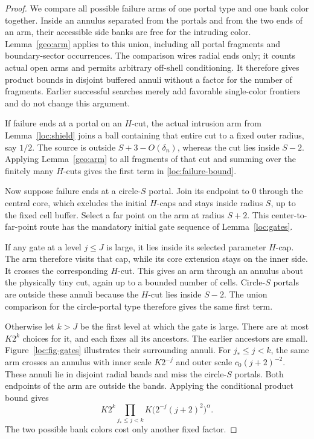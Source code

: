 \begin{proof}
We compare all possible failure arms of one portal type
and one bank color together. Inside an annulus separated
from the portals and from the two ends of an arm, their
accessible side banks are free for the intruding color.
Lemma~\ref{geo:arm} applies to this union, including all
portal fragments and boundary-sector occurrences.
The comparison wires radial ends only; it counts actual
open arms and permits arbitrary off-shell conditioning.
It therefore gives product bounds in disjoint buffered
annuli without a factor for the number of fragments.
Earlier successful searches merely add favorable
single-color frontiers and do not change this argument.

If failure ends at a portal on an \(H\)-cut, the actual
intrusion arm from Lemma~\ref{loc:shield} joins a ball
containing that entire cut to a fixed outer radius,
say \(1/2\). The source is outside \(S+3-O(\delta_n)\),
whereas the cut lies inside \(S-2\). Applying
Lemma~\ref{geo:arm} to all fragments of that cut and
summing over the finitely many \(H\)-cuts gives the
first term in \eqref{loc:failure-bound}.

Now suppose failure ends at a circle-\(S\) portal.
Join its endpoint to \(0\) through the central core,
which excludes the initial \(H\)-caps and stays
inside radius \(S\), up to the fixed cell buffer.
Select a far point on the arm at radius \(S+2\).
This center-to-far-point route has the mandatory
initial gate sequence of Lemma~\ref{loc:gates}.

If any gate at a level \(j\le J\) is large, it lies
inside its selected parameter \(H\)-cap. The arm
therefore visits that cap, while its core extension
stays on the inner side. It crosses the corresponding
\(H\)-cut. This gives an arm through an annulus about
the physically tiny cut, again up to a bounded number
of cells. Circle-\(S\) portals are outside these
annuli because the \(H\)-cut lies inside \(S-2\).
The union comparison for the circle-portal type
therefore gives the same first term.

Otherwise let \(k>J\) be the first level at which
the gate is large. There are at most \(K2^k\)
choices for it, and each fixes all its ancestors.
The earlier ancestors are small.
Figure~\ref{loc:fig-gates} illustrates their surrounding annuli. For
\(j_*\le j<k\), the same arm crosses an annulus
with inner scale \(K2^{-j}\) and outer scale
\(c_0(j+2)^{-2}\). These annuli lie in disjoint
radial bands and miss the circle-\(S\) portals.
Both endpoints of the arm are outside the bands.
Applying the conditional product bound gives
\[
 K2^k\prod_{j_*\le j<k}
       K\bigl(2^{-j}(j+2)^2\bigr)^\alpha .
 \]
The two possible bank colors cost only another
fixed factor.


\end{proof}
